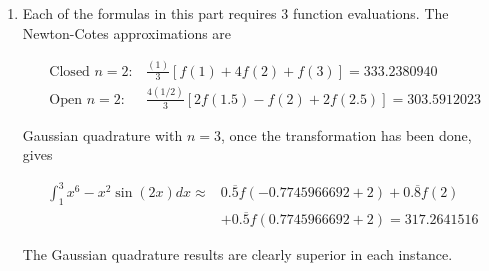 \documentclass[12pt,a4paper]{article}
\begin{document}
\begin{example}
\begin{enumerate}[label=(\alph*)]
Gaussian quadrature with $n=2$ then gives\\
$\int_{1}^{3} x^{6}-x^{2} \sin (2 x) d x \approx f(-0.5773502692+2)+f(0.5773502692+2)=306.8199344 ;$\\
\item Each of the formulas in this part requires 3 function evaluations. The Newton-Cotes approximations are

$$
\begin{aligned}
\text { Closed } n=2: & \frac{(1)}{3}[f(1)+4 f(2)+f(3)]=333.2380940 \\
\text { Open } n=2: & \frac{4(1 / 2)}{3}[2 f(1.5)-f(2)+2 f(2.5)]=303.5912023
\end{aligned}
$$

Gaussian quadrature with $n=3$, once the transformation has been done, gives

$$
\begin{aligned}
\int_{1}^{3} x^{6}-x^{2} \sin (2 x) d x \approx & 0 . \overline{5} f(-0.7745966692+2)+0 . \overline{8} f(2) \\
& +0 . \overline{5} f(0.7745966692+2)=317.2641516
\end{aligned}
$$

The Gaussian quadrature results are clearly superior in each instance.
\end{enumerate}
\end{example}
%
%
\end{document}
